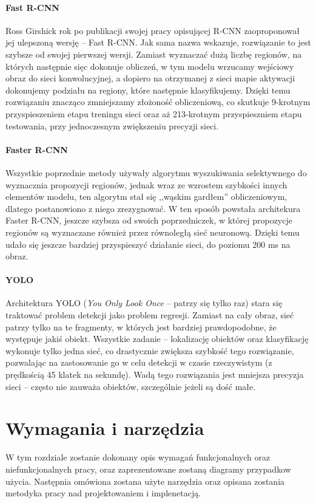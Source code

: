 \documentclass[a4paper,twoside,12pt]{book}
\newcommand{\obcy}[1]{\emph{#1}}
\newcommand{\ang}[1]{{\selectlanguage{british}\obcy{#1}}}
\begin{document}
{\subsubsection{Fast R-CNN\cite{girshick2015fast}}
{Ross Girshick rok po publikacji swojej pracy opisującej R-CNN zaoproponował jej ulepszoną wersję – Fast R-CNN. Jak sama nazwa wskazuje, rozwiązanie to jest szybsze od swojej pierwszej wersji. Zamiast wyznaczać dużą liczbę regionów, na których następnie sięc dokonuje obliczeń, w tym modelu wrzucamy wejściowy obraz do sieci konwolucyjnej, a dopiero na otrzymanej z sieci mapie aktywacji dokonujemy podziału na regiony, które następnie klasyfikujemy. Dzięki temu rozwiązaniu znacząco zmniejszamy złożoność obliczeniową, co skutkuje 9-krotnym przyspieszeniem etapu treningu sieci oraz aż 213-krotnym przyspieszniem etapu testowania, przy jednoczesnym zwiększeniu precyzji sieci.}
\subsubsection{Faster R-CNN\cite{ren2015faster}}
{Wszystkie poprzednie metody używały algorytmu wyszukiwania selektywnego do wyznacznia propozycji regionów, jednak wraz ze wzrostem szybkości innych elementów modelu, ten algorytm stał się ,,wąskim gardłem'' obliczeniowym, dlatego postanowiono z niego zrezygnować. W ten sposób powstała architekura Faster R-CNN, jeszcze szybsza od swoich poprzedniczek, w której propozycje regionów są wyznaczane również przez równoległą sieć neuronową. Dzięki temu udało się jeszcze bardziej przyspieszyć działanie sieci, do poziomu 200 ms na obraz.}
\subsubsection{YOLO\cite{redmon2016you}}
{Architektura YOLO (\ang{You Only Look Once} – patrzy się tylko raz) stara się traktować problem detekcji jako problem regresji. Zamiast na cały obraz, sieć patrzy tylko na te fragmenty, w których jest bardziej prawdopodobne, że występuje jakiś obiekt. Wszystkie zadanie – lokalizację obiektów oraz klasyfikację wykonuje tylko jedna sieć, co drastycznie zwiększa szybkość tego rozwiązanie, pozwalając na zastosowanie go w celu detekcji w czasie rzeczywistym (z prędkością 45 klatek na sekundę). Wadą tego rozwiązania jest mniejsza precyzja sieci – często nie zauważa obiektów, szczególnie jeżeli są dość małe.}


 
\chapter{Wymagania i narzędzia}
{W tym rozdziale zostanie dokonany opis wymagań funkcjonalnych oraz niefunkcjonalnych pracy, oraz zaprezentowane zostaną diagramy przypadkow użycia. Następnia omówiona zostana użyte narzędzia oraz opisana zostania metodyka pracy nad projektowaniem i implenetacją.}
}
\end{document}
